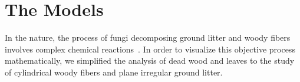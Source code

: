 \section{The Models}
In the nature, the process of fungi decomposing ground litter and woody fibers involves complex chemical reactions~\cite{chemicalreactions}. In order to visualize this objective process mathematically, we simplified the analysis of dead wood and leaves to the study of cylindrical woody fibers and plane irregular ground litter.





